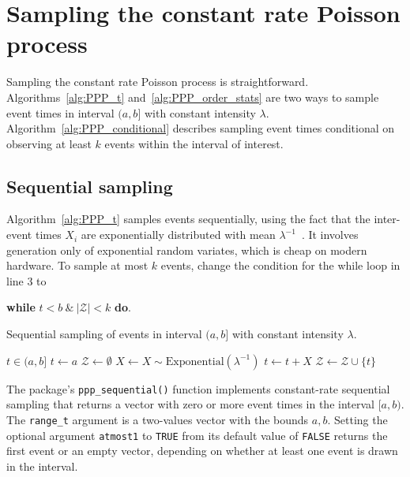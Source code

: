 \documentclass[10pt,letterpaper]{article}
\newcommand{\fct}[1]{\texttt{#1()}}
\newcommand{\code}[1]{\texttt{#1}}
\begin{document}
\section{Sampling the constant rate Poisson process}\label{sec:sample-ppp}

Sampling the constant rate Poisson process is straightforward. Algorithms~\ref{alg:PPP_t} and~\ref{alg:PPP_order_stats} are two ways to sample event times in interval $(a, b]$ with constant intensity $\lambda$. Algorithm~\ref{alg:PPP_conditional} describes sampling event times conditional on observing at least $k$ events within the interval of interest.


\subsection{Sequential sampling}\label{sec:PPP_t}

Algorithm~\ref{alg:PPP_t} samples events sequentially, using the fact that the inter-event times $X_i$ are exponentially distributed with mean $\lambda^{-1}$~\cite[par. 4.1]{cox1965theory}. It involves generation only of exponential random variates, which is cheap on modern hardware. To sample at most $k$ events, change the condition for the while loop in line 3 to
\begin{center}
\textbf{while} {$t <b  \ \& \  |\mathcal{Z}| < k$} \textbf{do}.
\end{center}



\begin{algorithm}[ht!]
\caption{Sequential sampling of events in interval $(a, b]$ with constant intensity $\lambda$. }\label{alg:PPP_t}
\begin{algorithmic}[1]
\Require $t \in (a, b]$
\State $t \gets a$
\State $\mathcal{Z} \gets \emptyset$ 
   
    \State $X \gets X \sim \textrm{Exponential}(\lambda^{-1})$ 
    \State $t \gets t + X$
        \State $\mathcal{Z} \gets \mathcal{Z} \cup \{t\} $
    \EndIf
\EndWhile
\State
{}
\end{algorithmic}
\end{algorithm}


The package's \fct{ppp\_sequential} function implements constant-rate sequential sampling that returns a vector with zero or more event times in the interval $[a, b)$. The \code{range\_t} argument is a two-values vector with the bounds $a, b$. 
Setting the optional argument \code{atmost1} to \code{TRUE} from its default value of \code{FALSE} returns the first event or an empty vector, depending on whether at least one event is drawn in the interval.
\end{document}
